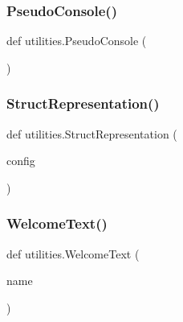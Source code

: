 \subsubsection{\texorpdfstring{Pseudo\+Console()}{PseudoConsole()}}
{\footnotesize\ttfamily def utilities.\+Pseudo\+Console (\begin{DoxyParamCaption}{ }\end{DoxyParamCaption})}

\mbox{\label{namespaceutilities_aa2added918da29f1fa28d3ea24d570d9}} 
\subsubsection{\texorpdfstring{Struct\+Representation()}{StructRepresentation()}}
{\footnotesize\ttfamily def utilities.\+Struct\+Representation (\begin{DoxyParamCaption}\item[{}]{config }\end{DoxyParamCaption})}

\mbox{\label{namespaceutilities_a7c64a494f834c091373f2bb148dc2e8c}} 
\subsubsection{\texorpdfstring{Welcome\+Text()}{WelcomeText()}}
{\footnotesize\ttfamily def utilities.\+Welcome\+Text (\begin{DoxyParamCaption}\item[{}]{name }\end{DoxyParamCaption})}

